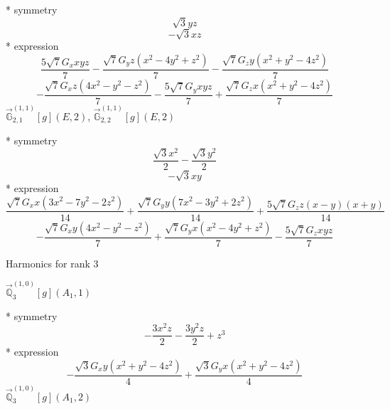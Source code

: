 \documentclass[fleqn,8pt]{jsarticle}
\begin{document}
\noindent\quad ** symmetry
\begin{dmath*}
\sqrt{3} y z
\end{dmath*}
\begin{dmath*}
- \sqrt{3} x z
\end{dmath*}
\noindent\quad ** expression
\begin{dmath*}
\frac{5 \sqrt{7} G_{x} x y z}{7} - \frac{\sqrt{7} G_{y} z \left(x^{2} - 4 y^{2} + z^{2}\right)}{7} - \frac{\sqrt{7} G_{z} y \left(x^{2} + y^{2} - 4 z^{2}\right)}{7}
\end{dmath*}
\begin{dmath*}
- \frac{\sqrt{7} G_{x} z \left(4 x^{2} - y^{2} - z^{2}\right)}{7} - \frac{5 \sqrt{7} G_{y} x y z}{7} + \frac{\sqrt{7} G_{z} x \left(x^{2} + y^{2} - 4 z^{2}\right)}{7}
\end{dmath*}
\noindent\quad $\vec{\mathbb{G}}_{2,1}^{(1,1)}[g](E,2)$, $\vec{\mathbb{G}}_{2,2}^{(1,1)}[g](E,2)$

\noindent\quad ** symmetry
\begin{dmath*}
\frac{\sqrt{3} x^{2}}{2} - \frac{\sqrt{3} y^{2}}{2}
\end{dmath*}
\begin{dmath*}
- \sqrt{3} x y
\end{dmath*}
\noindent\quad ** expression
\begin{dmath*}
\frac{\sqrt{7} G_{x} x \left(3 x^{2} - 7 y^{2} - 2 z^{2}\right)}{14} + \frac{\sqrt{7} G_{y} y \left(7 x^{2} - 3 y^{2} + 2 z^{2}\right)}{14} + \frac{5 \sqrt{7} G_{z} z \left(x - y\right) \left(x + y\right)}{14}
\end{dmath*}
\begin{dmath*}
- \frac{\sqrt{7} G_{x} y \left(4 x^{2} - y^{2} - z^{2}\right)}{7} + \frac{\sqrt{7} G_{y} x \left(x^{2} - 4 y^{2} + z^{2}\right)}{7} - \frac{5 \sqrt{7} G_{z} x y z}{7}
\end{dmath*}

\noindent * Harmonics for rank 3

\noindent\quad $\vec{\mathbb{Q}}_{3}^{(1,0)}[g](A_{1},1)$

\noindent\quad ** symmetry
\begin{dmath*}
- \frac{3 x^{2} z}{2} - \frac{3 y^{2} z}{2} + z^{3}
\end{dmath*}
\noindent\quad ** expression
\begin{dmath*}
- \frac{\sqrt{3} G_{x} y \left(x^{2} + y^{2} - 4 z^{2}\right)}{4} + \frac{\sqrt{3} G_{y} x \left(x^{2} + y^{2} - 4 z^{2}\right)}{4}
\end{dmath*}
\noindent\quad $\vec{\mathbb{Q}}_{3}^{(1,0)}[g](A_{1},2)$
\end{document}
